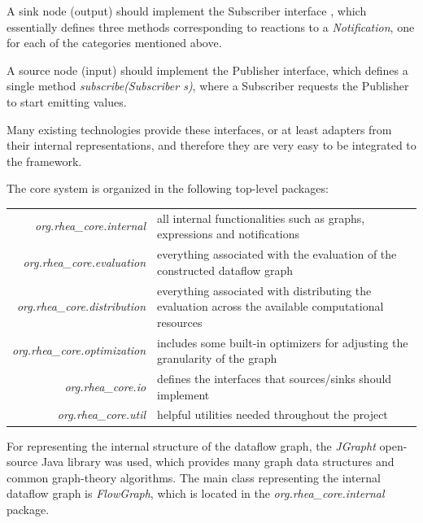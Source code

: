 \documentclass{dithesis}
\begin{document}
A sink node (output) should implement the Subscriber interface , which essentially defines three methods corresponding to reactions to a \textit{Notification}, one for each of the categories mentioned above. 

A source node (input) should implement the Publisher interface, which defines a single method \textit{subscribe(Subscriber s)}, where a Subscriber requests the Publisher to start emitting values. 

Many existing technologies provide these interfaces, or at least adapters from their internal representations, and therefore they are very easy to be integrated to the framework.

\newpage

The core system is organized in the following top-level packages:

\begin{tabularx}{\textwidth}{rX}
	\textit{org.rhea\_core.internal} 
	& all internal functionalities such as graphs, expressions and notifications \\
	\textit{org.rhea\_core.evaluation}
	& everything associated with the evaluation of the constructed dataflow graph \\
	\textit{org.rhea\_core.distribution}
	& everything associated with distributing the evaluation across the available computational resources \\
	\textit{org.rhea\_core.optimization}	
	& includes some built-in optimizers for adjusting the  granularity of the graph \\
	\textit{org.rhea\_core.io}
	& defines the interfaces that sources/sinks should implement \\
	\textit{org.rhea\_core.util}
	& helpful utilities needed throughout the project \\
\end{tabularx}


For representing the internal structure of the dataflow graph, the \textit{JGrapht} open-source Java library was used, which provides many graph data structures and common graph-theory algorithms. The main class representing the internal dataflow graph is \textit{FlowGraph},  which is located in the \textit{org.rhea\_core.internal} package.
\end{document}
